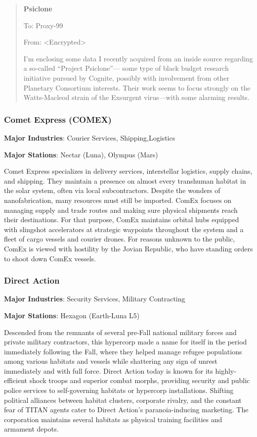 \begin{quotation}
  \textbf{Psiclone}

  To: Proxy-99

  From: <Encrypted>

  I'm enclosing some data I recently acquired from an inside source
  regarding a so-called “Project Psiclone”— some type of black
  budget research initiative pursued by Cognite, possibly with
  involvement from other Planetary Consortium interests. Their work
  seems to focus strongly on the Watts-Macleod strain of the Exsurgent
  virus—with some alarming results.
\end{quotation}

\subsubsection{Comet Express (COMEX)}
\label{sec:comet-express-comex}

\textbf{Major Industries}: Courier Services, Shipping,Logistics

\textbf{Major Stations}: Nectar (Luna), Olympus (Mars)


Comet Express specializes in delivery services, interstellar
logistics, supply chains, and shipping. They maintain a presence on
almost every transhuman habitat in the solar system, often via local
subcontractors. Despite the wonders of nanofabrication, many resources
must still be imported. ComEx focuses on managing supply and trade
routes and making sure physical shipments reach their
destinations. For that purpose, ComEx maintains orbital hubs equipped
with slingshot accelerators at strategic waypoints throughout the
system and a fleet of cargo vessels and courier drones. For reasons
unknown to the public, ComEx is viewed with hostility by the Jovian
Republic, who have standing orders to shoot down ComEx vessels.

\subsubsection{Direct Action}
\label{sec:direct-action}

\textbf{Major Industries}: Security Services, Military Contracting

\textbf{Major Stations}: Hexagon (Earth-Luna L5)


Descended from the remnants of several pre-Fall national military
forces and private military contractors, this hypercorp made a name
for itself in the period immediately following the Fall, where they
helped manage refugee populations among various habitats and vessels
while shattering any sign of unrest immediately and with full
force. Direct Action today is known for its highly-efficient shock
troops and superior combat morphs, providing security and public
police services to self-governing habitats or hypercorp
installations. Shifting political alliances between habitat clusters,
corporate rivalry, and the constant fear of TITAN agents cater to
Direct Action's paranoia-inducing marketing. The corporation maintains
several habitats as physical training facilities and armament depots.

